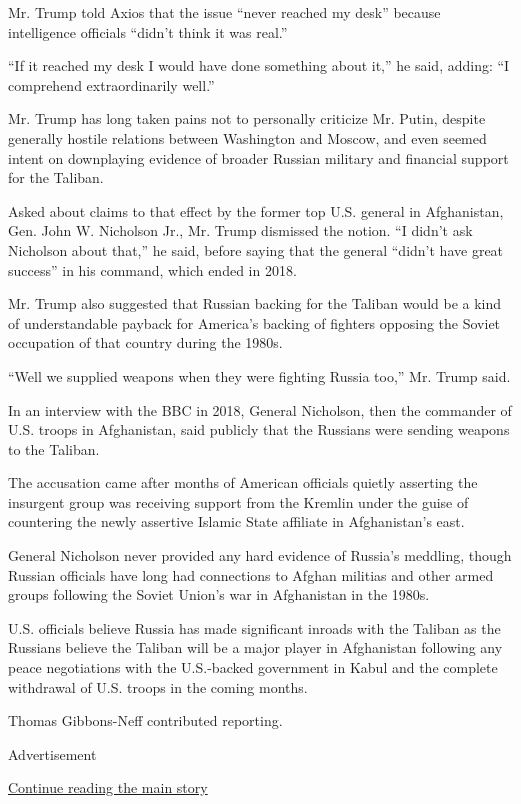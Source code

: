 Mr. Trump told Axios that the issue ``never reached my desk'' because
intelligence officials ``didn't think it was real.''

``If it reached my desk I would have done something about it,'' he said,
adding: ``I comprehend extraordinarily well.''

Mr. Trump has long taken pains not to personally criticize Mr. Putin,
despite generally hostile relations between Washington and Moscow, and
even seemed intent on downplaying evidence of broader Russian military
and financial support for the Taliban.

Asked about claims to that effect by the former top U.S. general in
Afghanistan, Gen. John W. Nicholson Jr., Mr. Trump dismissed the notion.
``I didn't ask Nicholson about that,'' he said, before saying that the
general ``didn't have great success'' in his command, which ended in
2018.

Mr. Trump also suggested that Russian backing for the Taliban would be a
kind of understandable payback for America's backing of fighters
opposing the Soviet occupation of that country during the 1980s.

``Well we supplied weapons when they were fighting Russia too,'' Mr.
Trump said.

In an interview with the BBC in 2018, General Nicholson, then the
commander of U.S. troops in Afghanistan, said publicly that the Russians
were sending weapons to the Taliban.

The accusation came after months of American officials quietly asserting
the insurgent group was receiving support from the Kremlin under the
guise of countering the newly assertive Islamic State affiliate in
Afghanistan's east.

General Nicholson never provided any hard evidence of Russia's meddling,
though Russian officials have long had connections to Afghan militias
and other armed groups following the Soviet Union's war in Afghanistan
in the 1980s.

U.S. officials believe Russia has made significant inroads with the
Taliban as the Russians believe the Taliban will be a major player in
Afghanistan following any peace negotiations with the U.S.-backed
government in Kabul and the complete withdrawal of U.S. troops in the
coming months.

Thomas Gibbons-Neff contributed reporting.

Advertisement

\protect\hyperlink{after-bottom}{Continue reading the main story}

